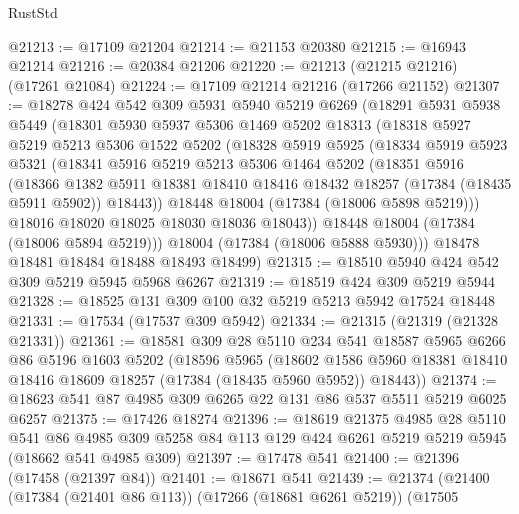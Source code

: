 \begin{lexlean}{RustStd}
\begin{coremodule}
@21213 := @17109 @21204
@21214 := @21153 @20380
@21215 := @16943 @21214
@21216 := @20384 @21206
@21220 := @21213 (@21215 @21216) (@17261 @21084)
@21224 := @17109 @21214 @21216 (@17266 @21152)
@21307 := @18278
    @424
    @542
    @309
    @5931
    @5940
    @5219
    @6269
    (@18291
      @5931
      @5938
      @5449
      (@18301
        @5930
        @5937
        @5306
        @1469
        @5202
        @18313
        (@18318
          @5927
          @5219
          @5213
          @5306
          @1522
          @5202
          (@18328
            @5919
            @5925
            (@18334
              @5919
              @5923
              @5321
              (@18341
                @5916
                @5219
                @5213
                @5306
                @1464
                @5202
                (@18351
                  @5916
                  (@18366
                    @1382
                    @5911
                    @18381
                    @18410
                    @18416
                    @18432
                    @18257
                    (@17384 (@18435 @5911 @5902))
                    @18443))
                @18448
                @18004
                (@17384 (@18006 @5898 @5219)))
              @18016
              @18020
              @18025
              @18030
              @18036
              @18043))
          @18448
          @18004
          (@17384 (@18006 @5894 @5219)))
        @18004
        (@17384 (@18006 @5888 @5930)))
      @18478
      @18481
      @18484
      @18488
      @18493
      @18499)
@21315 := @18510 @5940 @424 @542 @309 @5219 @5945 @5968 @6267
@21319 := @18519 @424 @309 @5219 @5944
@21328 := @18525 @131 @309 @100 @32 @5219 @5213 @5942 @17524 @18448
@21331 := @17534 (@17537 @309 @5942)
@21334 := @21315 (@21319 (@21328 @21331))
@21361 := @18581
    @309
    @28
    @5110
    @234
    @541
    @18587
    @5965
    @6266
    @86
    @5196
    @1603
    @5202
    (@18596
      @5965
      (@18602 @1586 @5960 @18381 @18410 @18416 @18609 @18257 (@17384 (@18435 @5960 @5952)) @18443))
@21374 := @18623 @541 @87 @4985 @309 @6265 @22 @131 @86 @537 @5511 @5219 @6025 @6257
@21375 := @17426 @18274
@21396 := @18619
    @21375
    @4985
    @28
    @5110
    @541
    @86
    @4985
    @309
    @5258
    @84
    @113
    @129
    @424
    @6261
    @5219
    @5219
    @5945
    (@18662 @541 @4985 @309)
@21397 := @17478 @541
@21400 := @21396 (@17458 (@21397 @84))
@21401 := @18671 @541
@21439 := @21374
    (@21400
      (@17384 (@21401 @86 @113))
      (@17266 (@18681 @6261 @5219))
      (@17505

\end{coremodule}
\end{lexlean}
